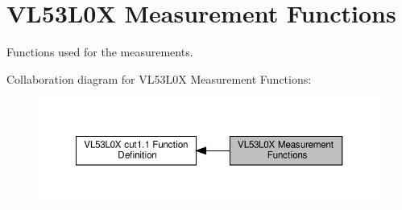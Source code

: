 \hypertarget{group__VL53L0X__measurement__group}{}\section{V\+L53\+L0X Measurement Functions}
\label{group__VL53L0X__measurement__group}


Functions used for the measurements.  


Collaboration diagram for V\+L53\+L0X Measurement Functions\+:\nopagebreak
\begin{figure}[H]
\begin{center}
\leavevmode
\includegraphics[width=350pt]{group__VL53L0X__measurement__group}
\end{center}
\end{figure}
